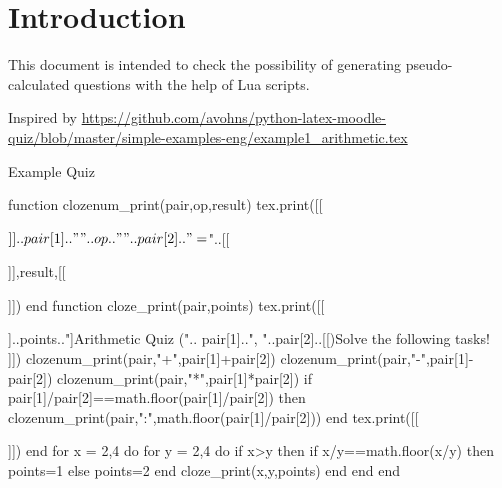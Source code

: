 \documentclass{article}
\begin{document}
\section*{Introduction}

This document is intended to check the possibility of generating 
pseudo-calculated questions with the help of Lua scripts.

Inspired by
\url{https://github.com/avohns/python-latex-moodle-quiz/blob/master/simple-examples-eng/example1_arithmetic.tex}

\begin{quiz}[tags={calculated}]{Example Quiz}
\begin{luacode*}
function clozenum_print(pair,op,result)
  tex.print([[\begin{numerical}$]]..pair[1].." "..op.." "..pair[2]..
  " = $"..[[\item ]],result,[[\end{numerical}]])
end
function cloze_print(pair,points)
  tex.print([[\begin{cloze}[points=]]..points.."]{Arithmetic Quiz ("..
  pair[1]..", "..pair[2]..[[)}Solve the following tasks!\\]])
  clozenum_print(pair,"+",pair[1]+pair[2])
  clozenum_print(pair,"-",pair[1]-pair[2])
  clozenum_print(pair,"*",pair[1]*pair[2])
  if pair[1]/pair[2]==math.floor(pair[1]/pair[2]) then
    clozenum_print(pair,":",math.floor(pair[1]/pair[2]))
  end
  tex.print([[\end{cloze}]])
end
for x = 2,4 do
  for y = 2,4 do
    if x>y then
      if x/y==math.floor(x/y) then points=1 else points=2 end
      cloze_print({x,y},points)
    end
  end
end
\end{luacode*}
\end{quiz}
\end{document}

